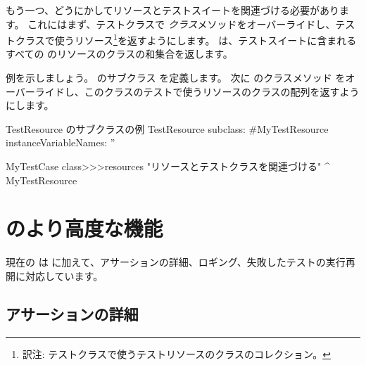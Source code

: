 \documentclass[a4paper,10pt,twoside]{book}
\begin{document}
もう一つ、どうにかしてリソースとテストスイートを関連づける必要があります。
これにはまず、テストクラスで  \emph{クラス}メソッドをオーバーライドし、テストクラスで使うリソース\footnote{訳注: テストクラスで使うテストリソースのクラスのコレクション。}を返すようにします。
\ab{}
 は、テストスイートに含まれるすべての  のリソースのクラスの和集合を返します。

例を示しましょう。
 のサブクラス  を定義します。
次に  のクラスメソッド  をオーバーライドし、このクラスのテストで使うリソースのクラスの配列を返すようにします。

\begin{classdef}[mytestresource]{TestResource のサブクラスの例}
TestResource subclass: #MyTestResource
	instanceVariableNames: ''

MyTestCase class>>>resources
	"リソースとテストクラスを関連づける"
	^{ MyTestResource }
\end{classdef}






\section{\SUnit のより高度な機能}
現在の \sunit は  に加えて、アサーションの詳細、ロギング、失敗したテストの実行再開に対応しています。%

\subsection{アサーションの詳細}
\end{document}
